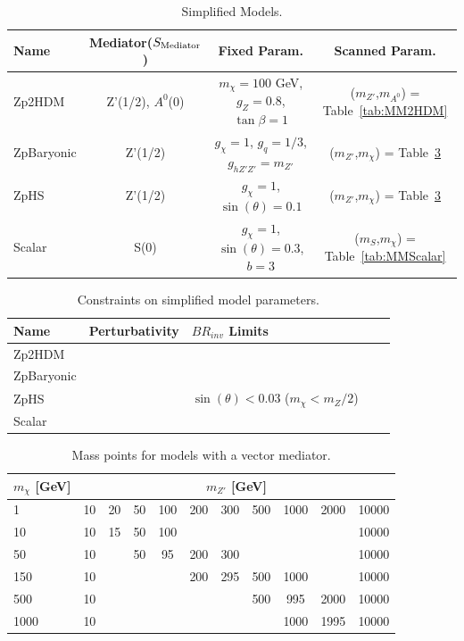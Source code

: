 \begin{table}[htbH]
\begin{center}
\begin{tabular}{ l | c | c | c}
\hline
Name & Mediator($S_{\rm{Mediator}}$) & Fixed Param. & Scanned Param.\\
\hline
Zp2HDM & Z'(1/2), $A^0$(0) & $m_\chi = 100$ GeV, $g_Z = 0.8$, $\tan\beta = 1$ & ($m_{Z'}$,$m_{A^0}$) = Table~\ref{tab:MM2HDM} \\
ZpBaryonic & Z'(1/2) & $g_\chi = 1$, $g_q = 1/3$, $g_{hZ'Z'} = m_{Z'}$ & ($m_{Z'}$,$m_\chi$) = Table~\ref{tab:MMVector} \\
ZpHS & Z'(1/2) & $g_\chi = 1$, $\sin(\theta) = 0.1$ & ($m_{Z'}$,$m_\chi$) = Table~\ref{tab:MMVector} \\
Scalar & S(0) & $g_\chi = 1$, $\sin(\theta) = 0.3$, $b = 3$ & ($m_{S}$,$m_\chi$) = Table~\ref{tab:MMScalar}\\
\hline
\end{tabular}
\caption{Simplified Models.}\label{tab:sms}
\end{center}
\end{table}

\begin{table}[htbH]
\begin{center}
\begin{tabular}{ l | c | l | c | c}
\hline
Name & Perturbativity & $BR_{inv}$ Limits \\
\hline
Zp2HDM & & \\
ZpBaryonic & & \\
ZpHS & & $\sin(\theta) < 0.03$ ($m_\chi < m_Z/2$) \\
Scalar & & \\
\hline
\end{tabular}
\caption{Constraints on simplified model parameters.}\label{tab:smlims}
\end{center}
\end{table}

\begin{table}[htbH]
\begin{center}
\begin{tabular}{ l | c | c | c | c | c | c | c | c | c | c}
\hline
$m_\chi$ [GeV] & \multicolumn{10}{|c}{$m_{Z'}$ [GeV]} \\
\hline
1 & 10 & 20 & 50 & 100 & 200 & 300 & 500 & 1000 & 2000 & 10000 \\
10 & 10 & 15 & 50 & 100 & & & & & & 10000 \\
50 & 10 & & 50 & 95  & 200 & 300 & & & & 10000 \\
150 & 10 & & & & 200 & 295 & 500 & 1000 & & 10000 \\
500 & 10 & & & & & & 500 & 995 & 2000 & 10000 \\
1000 & 10 & & & & & & & 1000 & 1995 & 10000 \\
\hline
\end{tabular}
\caption{Mass points for models with a vector mediator.}\label{tab:MMVector}
\end{center}
\end{table}

